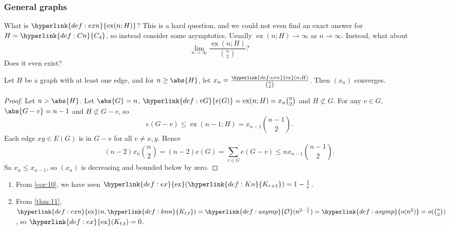 \documentclass{article}
\DeclareMathOperator{\ext}{ex}
\begin{document}
\subsubsection{General graphs}

What is $\hyperlink{def:exn}{\ext(n; H)}$? This is a hard question, and we could not even find an exact answer for $H = \hyperlink{def:Cn}{C_4}$, so instead consider some asymptotics.
Usually $\ext(n; H) \to \infty$ as $n \to \infty$.
Instead, what about
\begin{equation*}\lim_{n \to \infty} \frac{\ext(n; H)}{\binom{n}{2}}?\end{equation*}
Does it even exist?

\begin{nprop}\label{prop:13}
    Let $H$ be a graph with at least one edge, and for $n \geq \abs{H}$, let $x_n = \frac{\hyperlink{def:exn}{\ext}(n; H)}{\binom{n}{2}}$. Then $(x_n)$ converges.
\end{nprop}

\begin{proof}
    Let $n > \abs{H}$. Let $\abs{G} = n$, $\hyperlink{def:eG}{e(G)} = \ext(n; H) = x_n \binom{n}{2}$ and $H \not\subset G$.
    For any $v \in G$, $\abs{G - v} = n-1$ and $H \not\subset G - v$, so
    \begin{equation*}e(G-v) \leq \ext(n-1; H) = x_{n-1} \binom{n-1}{2}.\end{equation*}
    Each edge $xy \in E(G)$ is in $G-v$ for all $v \neq x, y$.
    Hence \begin{equation*}(n-2) x_n \binom{n}{2} = (n-2) e(G) = \sum_{v \in G} e(G-v) \leq n x_{n-1} \binom{n-1}{2}.\end{equation*}
    So $x_n \leq x_{n-1}$, so $(x_n)$ is decreasing and bounded below by zero.
\end{proof}



\begin{eg}\leavevmode
    \begin{enumerate}
        \item From \cref{cor:10}, we have seen $\hyperlink{def:ex}{\ext}(\hyperlink{def:Kn}{K_{r+1}}) = 1 - \frac{1}{r}$.
        \item From \cref{thm:11}, $\hyperlink{def:exn}{\ext}(n, \hyperlink{def:knn}{K_{t, t}}) = \hyperlink{def:asymp}{\mathcal{O}}(n^{2 - \frac{1}{t}}) = \hyperlink{def:asymp}{o(n^2)} = o(\binom{n}{2})$, so $\hyperlink{def:ex}{\ext}(K_{t, t}) = 0$.
    \end{enumerate}
\end{eg}
\end{document}
